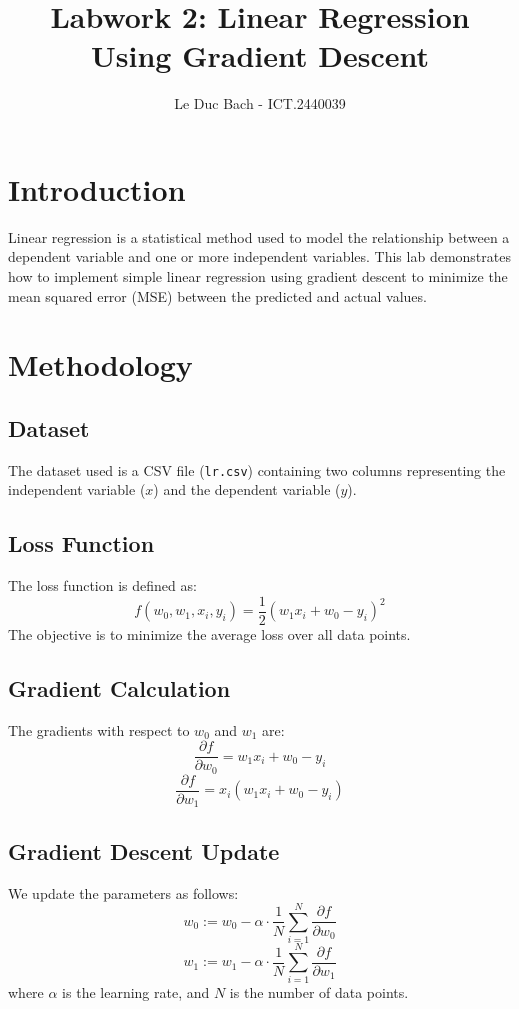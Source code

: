 \documentclass{article}
\title{Labwork 2: Linear Regression Using Gradient Descent}
\author{Le Duc Bach - ICT.2440039}
\date{}
\begin{document}
\maketitle

\section{Introduction}
Linear regression is a statistical method used to model the relationship between a dependent variable and one or more independent variables. This lab demonstrates how to implement simple linear regression using gradient descent to minimize the mean squared error (MSE) between the predicted and actual values.

\section{Methodology}
\subsection*{Dataset}
The dataset used is a CSV file (\texttt{lr.csv}) containing two columns representing the independent variable ($x$) and the dependent variable ($y$).

\subsection*{Loss Function}
The loss function is defined as:
\[
f(w_0, w_1, x_i, y_i) = \frac{1}{2}(w_1 x_i + w_0 - y_i)^2
\]
The objective is to minimize the average loss over all data points.

\subsection*{Gradient Calculation}
The gradients with respect to $w_0$ and $w_1$ are:
\[
\frac{\partial f}{\partial w_0} = w_1 x_i + w_0 - y_i
\]
\[
\frac{\partial f}{\partial w_1} = x_i(w_1 x_i + w_0 - y_i)
\]

\subsection*{Gradient Descent Update}
We update the parameters as follows:
\[
w_0 := w_0 - \alpha \cdot \frac{1}{N} \sum_{i=1}^{N} \frac{\partial f}{\partial w_0}
\]
\[
w_1 := w_1 - \alpha \cdot \frac{1}{N} \sum_{i=1}^{N} \frac{\partial f}{\partial w_1}
\]
where $\alpha$ is the learning rate, and $N$ is the number of data points.
\end{document}
